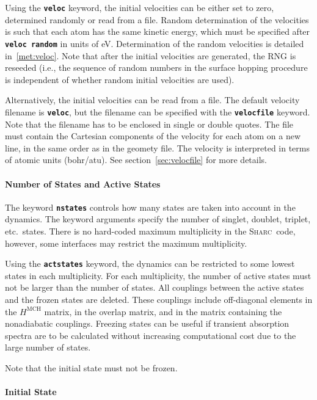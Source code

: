 \documentclass[a4paper,10pt,DIV=15,openany,twoside=false]{scrbook}
\newcommand{\sharc}{\textsc{Sharc}}
\newcommand{\ttt}[1]{\textbf{\texttt{#1}}}
\begin{document}
Using the \ttt{veloc} keyword, the initial velocities can be either set to zero, determined randomly or read from a file. Random determination of the velocities is such that each atom has the same kinetic energy, which must be specified after \ttt{veloc random} in units of eV. Determination of the random velocities is detailed in~\ref{met:veloc}. Note that after the initial velocities are generated, the RNG is reseeded (i.e., the sequence of random numbers in the surface hopping procedure is independent of whether random initial velocities are used).

Alternatively, the initial velocities can be read from a file. 
The default velocity filename is \ttt{veloc}, but the filename can be specified with the \ttt{velocfile} keyword. Note that the filename has to be enclosed in single or double quotes. The file must contain the Cartesian components of the velocity for each atom on a new line, in the same order as in the geomety file. The velocity is interpreted in terms of atomic units (bohr/atu). See section~\ref{sec:velocfile} for more details.

\paragraph{Number of States and Active States}

The keyword \ttt{nstates} controls how many states are taken into account in the dynamics. The keyword arguments specify the number of singlet, doublet, triplet, etc.\ states. There is no hard-coded maximum multiplicity in the \sharc\ code, however, some interfaces may restrict the maximum multiplicity. 

Using the \ttt{actstates} keyword, the dynamics can be restricted to some lowest states in each multiplicity. For each multiplicity, the number of active states must not be larger than the number of states. All couplings between the active states and the frozen states are deleted. These couplings include off-diagonal elements in the $H^{\text{MCH}}$ matrix, in the overlap matrix, and in the matrix containing the nonadiabatic couplings. Freezing states can be useful if transient absorption spectra are to be calculated without increasing computational cost due to the large number of states.

Note that the initial state must not be frozen.

\paragraph{Initial State}
\end{document}
